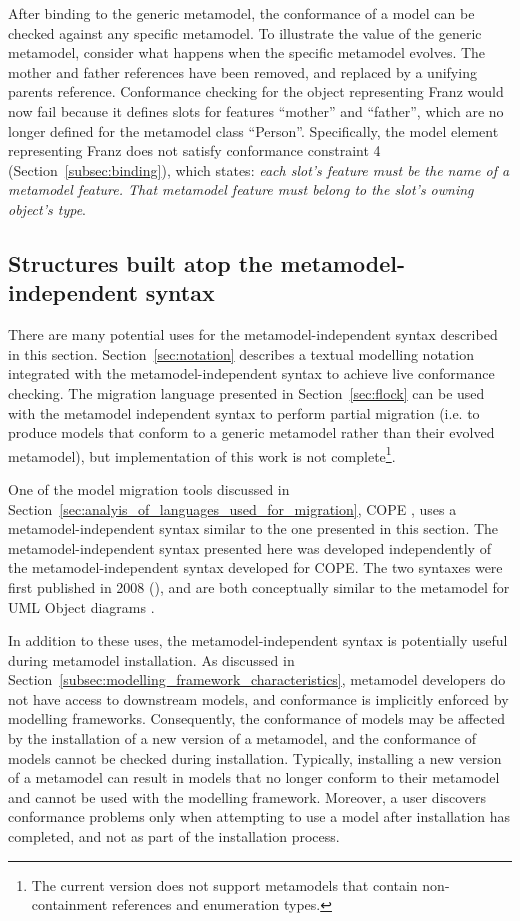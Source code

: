 After binding to the generic metamodel, the conformance of a model can be checked against any specific metamodel. To illustrate the value of the generic metamodel, consider what happens when the specific metamodel evolves. The mother and father references have been removed, and replaced by a unifying parents reference. Conformance checking for the object representing Franz would now fail because it defines slots for features ``mother'' and ``father'', which are no longer defined for the metamodel class ``Person''. Specifically, the model element representing Franz does not satisfy conformance constraint 4 (Section~\ref{subsec:binding}), which states: \emph{each slot's feature must be the name of a metamodel feature. That metamodel feature must belong to the slot's owning object's type}. 

\subsection{Structures built atop the metamodel-independent syntax}
There are many potential uses for the metamodel-independent syntax described in this section. Section~\ref{sec:notation} describes a textual modelling notation integrated with the metamodel-independent syntax to achieve live conformance checking. The migration language presented in Section~\ref{sec:flock} can be used with the metamodel independent syntax to perform partial migration (i.e. to produce models that conform to a generic metamodel rather than their evolved metamodel), but implementation of this work is not complete\footnote{The current version does not support metamodels that contain non-containment references and enumeration types.}.

One of the model migration tools discussed in Section~\ref{sec:analyis_of_languages_used_for_migration}, COPE \cite{herrmannsdoerfer09cope}, uses a metamodel-independent syntax similar to the one presented in this section. The metamodel-independent syntax presented here was developed independently of the metamodel-independent syntax developed for COPE. The two syntaxes were first published in 2008 (\cite{rose08hutn,herrmannsdoerfer08cope}), and are both conceptually similar to the metamodel for UML Object diagrams \cite{uml14}.

In addition to these uses, the metamodel-independent syntax is potentially useful during metamodel installation. As discussed in Section~\ref{subsec:modelling_framework_characteristics}, metamodel developers do not have access to downstream models, and conformance is implicitly enforced by modelling frameworks. Consequently, the conformance of models may be affected by the installation of a new version of a metamodel, and the conformance of models cannot be checked during installation. Typically, installing a new version of a metamodel can result in models that no longer conform to their metamodel and cannot be used with the modelling framework. Moreover, a user discovers conformance problems only when attempting to use a model after installation has completed, and not as part of the installation process.

